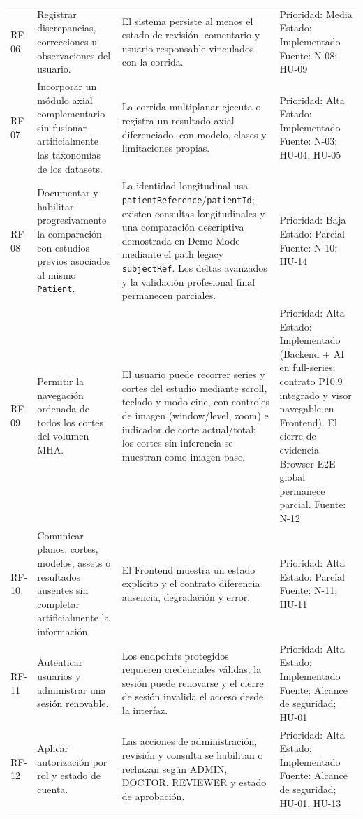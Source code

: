 {\begin{longtable}{>{\raggedright\arraybackslash}p{} >{\raggedright\arraybackslash}p{} >{\raggedright\arraybackslash}p{} >{\raggedright\arraybackslash}p{}}
RF-06 & Registrar discrepancias, correcciones u observaciones del usuario. & El sistema persiste al menos el estado de revisión, comentario y usuario responsable vinculados con la corrida. & Prioridad: Media Estado: Implementado Fuente: N-08; HU-09 \\
RF-07 & Incorporar un módulo axial complementario sin fusionar artificialmente las taxonomías de los datasets. & La corrida multiplanar ejecuta o registra un resultado axial diferenciado, con modelo, clases y limitaciones propias. & Prioridad: Alta Estado: Implementado Fuente: N-03; HU-04, HU-05 \\
RF-08 & Documentar y habilitar progresivamente la comparación con estudios previos asociados al mismo \texttt{Patient}. & La identidad longitudinal usa \texttt{patientReference}/\texttt{patientId}; existen consultas longitudinales y una comparación descriptiva demostrada en Demo Mode mediante el path legacy \texttt{subjectRef}. Los deltas avanzados y la validación profesional final permanecen parciales. & Prioridad: Baja Estado: Parcial Fuente: N-10; HU-14 \\
RF-09 & Permitir la navegación ordenada de todos los cortes del volumen MHA. & El usuario puede recorrer series y cortes del estudio mediante scroll, teclado y modo cine, con controles de imagen (window/level, zoom) e indicador de corte actual/total; los cortes sin inferencia se muestran como imagen base. & Prioridad: Alta Estado: Implementado (Backend + AI en full-series; contrato P10.9 integrado y visor navegable en Frontend). El cierre de evidencia Browser E2E global permanece parcial. Fuente: N-12 \\
RF-10 & Comunicar planos, cortes, modelos, assets o resultados ausentes sin completar artificialmente la información. & El Frontend muestra un estado explícito y el contrato diferencia ausencia, degradación y error. & Prioridad: Alta Estado: Parcial Fuente: N-11; HU-11 \\
RF-11 & Autenticar usuarios y administrar una sesión renovable. & Los endpoints protegidos requieren credenciales válidas, la sesión puede renovarse y el cierre de sesión invalida el acceso desde la interfaz. & Prioridad: Alta Estado: Implementado Fuente: Alcance de seguridad; HU-01 \\
RF-12 & Aplicar autorización por rol y estado de cuenta. & Las acciones de administración, revisión y consulta se habilitan o rechazan según ADMIN, DOCTOR, REVIEWER y estado de aprobación. & Prioridad: Alta Estado: Implementado Fuente: Alcance de seguridad; HU-01, HU-13 \\

\end{longtable}}
